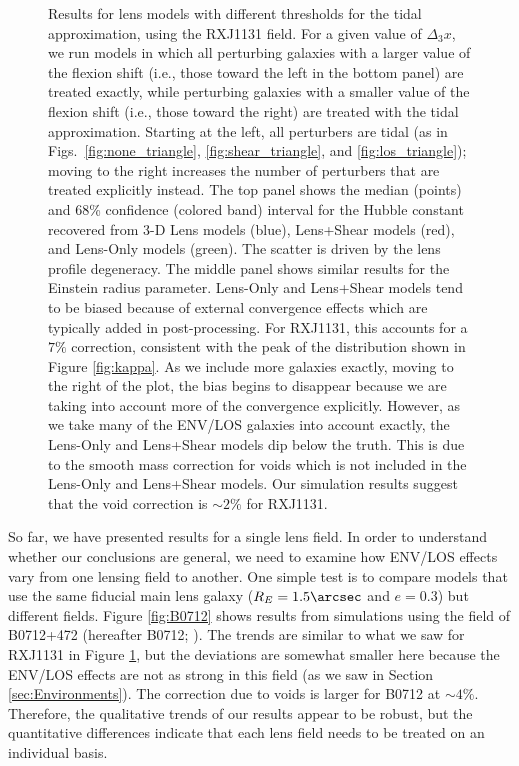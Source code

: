 \documentclass{emulateapj}
\begin{document}
\begin{figure}[ht]
\begin{center}
\caption{\label{fig:RXJ1131} Results for lens models with different thresholds for the tidal approximation, using the RXJ1131 field.  For a given value of $\Delta_3 x$, we run models in which all perturbing galaxies with a larger value of the flexion shift (i.e., those toward the left in the bottom panel) are treated exactly, while perturbing galaxies with a smaller value of the flexion shift (i.e., those toward the right) are treated with the tidal approximation.  Starting at the left, all perturbers are tidal (as in Figs.\ \ref{fig:none_triangle},  \ref{fig:shear_triangle}, and \ref{fig:los_triangle}); moving to the right increases the number of perturbers that are treated explicitly instead.  The top panel shows the median (points) and 68\% confidence (colored band) interval for the Hubble constant recovered from 3-D Lens models (blue), Lens+Shear models (red), and Lens-Only models (green). The scatter is driven by the lens profile degeneracy.  The middle panel shows similar results for the Einstein radius parameter. Lens-Only and Lens+Shear models tend to be biased because of external convergence effects which are typically added in post-processing. For RXJ1131, this accounts for a $7\%$ correction, consistent with the peak of the distribution shown in Figure \ref{fig:kappa}. As we include more galaxies exactly, moving to the right of the plot, the bias begins to disappear because we are taking into account more of the convergence explicitly. However, as we take many of the ENV/LOS galaxies into account exactly, the Lens-Only and Lens+Shear models dip below the truth. This is due to the smooth mass correction for voids which is not included in the Lens-Only and Lens+Shear models. Our simulation results suggest that the void correction is $\sim 2\%$ for RXJ1131.
}
\end{center}
\end{figure}

So far, we have presented results for a single lens field.  In order to understand whether our conclusions are general, we need to examine how ENV/LOS effects vary from one lensing field to another. One simple test is to compare models that use the same fiducial main lens galaxy ($R_E = 1.5\arcsec$ and $e=0.3$) but different fields.  Figure \ref{fig:B0712} shows results from simulations using the field of B0712+472 (hereafter B0712; \citealt{Jackson98}).  The trends are similar to what we saw for RXJ1131 in Figure \ref{fig:RXJ1131}, but the deviations are somewhat smaller here because the ENV/LOS effects are not as strong in this field (as we saw in Section \ref{sec:Environments}).  The correction due to voids is larger for B0712 at $\sim4\%$. Therefore, the qualitative trends of our results appear to be robust, but the quantitative differences indicate that each lens field needs to be treated on an individual basis.
\end{document}
